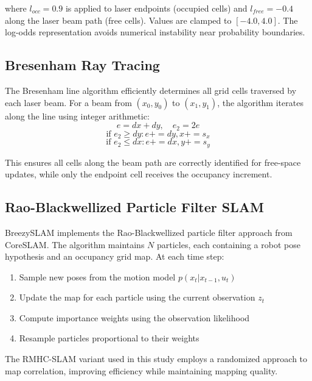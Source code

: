 \documentclass[conference]{IEEEtran}
\begin{document}
  where $l_{occ} = 0.9$ is applied to laser endpoints (occupied cells) and $l_{free} = -0.4$ along the
  laser beam path (free cells). Values are clamped to $[-4.0, 4.0]$. The log-odds representation avoids
  numerical instability near probability boundaries.

  \subsection{Bresenham Ray Tracing}

  The Bresenham line algorithm efficiently determines all grid cells traversed by each laser beam. For a
  beam from $(x_0, y_0)$ to $(x_1, y_1)$, the algorithm iterates along the line using integer arithmetic:
  \begin{equation}
  e = dx + dy, \quad e_2 = 2e
  \end{equation}
  \begin{equation}
  \text{if } e_2 \geq dy: e += dy, x += s_x
  \end{equation}
  \begin{equation}
  \text{if } e_2 \leq dx: e += dx, y += s_y
  \end{equation}

  This ensures all cells along the beam path are correctly identified for free-space updates, while only
  the endpoint cell receives the occupancy increment.

  \subsection{Rao-Blackwellized Particle Filter SLAM}

  BreezySLAM implements the Rao-Blackwellized particle filter approach from CoreSLAM. The algorithm
  maintains $N$ particles, each containing a robot pose hypothesis and an occupancy grid map. At each time
  step:

  \begin{enumerate}
      \item Sample new poses from the motion model $p(x_t | x_{t-1}, u_t)$
      \item Update the map for each particle using the current observation $z_t$
      \item Compute importance weights using the observation likelihood
      \item Resample particles proportional to their weights
  \end{enumerate}

  The RMHC-SLAM variant used in this study employs a randomized approach to map correlation, improving
  efficiency while maintaining mapping quality.
\end{document}
